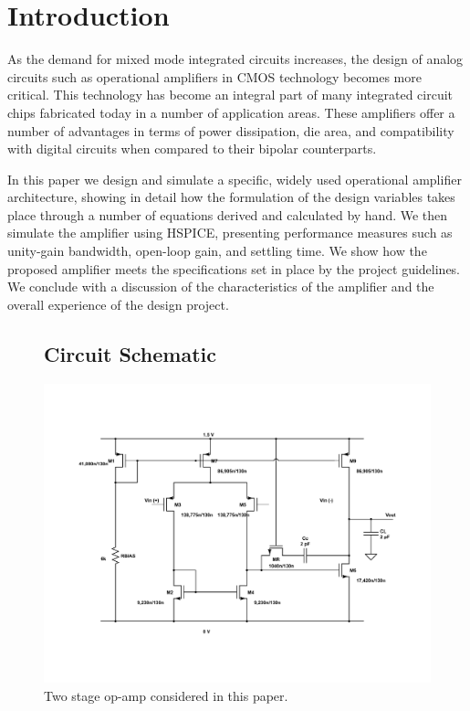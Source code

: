 \documentclass[]{article}
\begin{document}
\rmfamily
\setcounter{secnumdepth}{3}

	\begin{titlepage}
			
	\end{titlepage}
	
	
	\section{Introduction}
		As the demand for mixed mode integrated circuits increases, the design of analog circuits such as operational amplifiers in CMOS technology becomes more critical. This technology has become an integral part of many integrated circuit chips fabricated today in a number of application areas. These amplifiers offer a number of advantages in terms of power dissipation, die area, and compatibility with digital circuits when compared to their bipolar counterparts.
	
		In this paper we design and simulate a specific, widely used operational amplifier architecture, showing in detail how the formulation of the design variables takes place through a number of equations derived and calculated by hand. We then simulate the amplifier using HSPICE, presenting performance measures such as unity-gain bandwidth, open-loop gain, and settling time. We show how the proposed amplifier meets the specifications set in place by the project guidelines. We conclude with a discussion of the characteristics of the amplifier and the overall experience of the design project.
		
		\begin{figure}
			\subsection{Circuit Schematic}
			\includegraphics[width=1.2\textwidth]{CMOS_complete.pdf}
			\caption{Two stage op-amp considered in this paper.}
		\end{figure}
		\newpage
	
\end{document}
